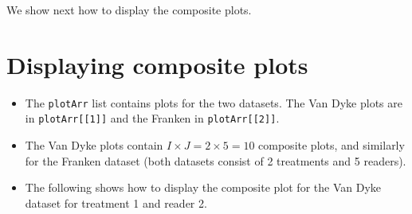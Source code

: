 \documentclass[
]{book}
\newenvironment{Shaded}{\begin{snugshade}}{\end{snugshade}}
\newcommand{\ControlFlowTok}[1]{\textcolor[rgb]{0.13,0.29,0.53}{\textbf{#1}}}
\newcommand{\DataTypeTok}[1]{\textcolor[rgb]{0.13,0.29,0.53}{#1}}
\newcommand{\DecValTok}[1]{\textcolor[rgb]{0.00,0.00,0.81}{#1}}
\newcommand{\KeywordTok}[1]{\textcolor[rgb]{0.13,0.29,0.53}{\textbf{#1}}}
\newcommand{\NormalTok}[1]{#1}
\newcommand{\OperatorTok}[1]{\textcolor[rgb]{0.81,0.36,0.00}{\textbf{#1}}}
\newcommand{\OtherTok}[1]{\textcolor[rgb]{0.56,0.35,0.01}{#1}}
\newcommand{\StringTok}[1]{\textcolor[rgb]{0.31,0.60,0.02}{#1}}
\providecommand{\tightlist}{%
  \setlength{\itemsep}{0pt}\setlength{\parskip}{0pt}}
\begin{document}
\begin{Shaded}
\end{Shaded}

We show next how to display the composite plots.

\hypertarget{rsm-3-fits-composite-plots}{%
\section{Displaying composite plots}\label{rsm-3-fits-composite-plots}}

\begin{itemize}
\tightlist
\item
  The \texttt{plotArr} list contains plots for the two datasets. The Van Dyke plots are in \texttt{plotArr{[}{[}1{]}{]}} and the Franken in \texttt{plotArr{[}{[}2{]}{]}}.
\item
  The Van Dyke plots contain \(I \times J = 2 \times 5 = 10\) composite plots, and similarly for the Franken dataset (both datasets consist of 2 treatments and 5 readers).
\item
  The following shows how to display the composite plot for the Van Dyke dataset for treatment 1 and reader 2.
\end{itemize}
\end{document}
